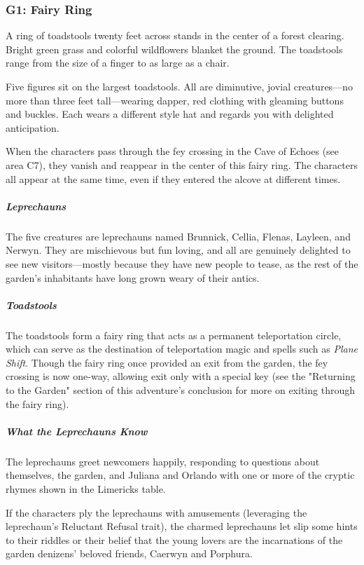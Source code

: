 \documentclass[10pt,a4paper,twoside,bg=print,twocolumn,openany,nodeprecatedcode]{dndbook}
\begin{document}
\subsubsection{G1: Fairy Ring}
\begin{DndReadAloud}{}
A ring of toadstools twenty feet across stands in the center of a forest clearing. Bright green grass and colorful wildflowers blanket the ground. The toadstools range from the size of a finger to as large as a chair.

Five figures sit on the largest toadstools. All are diminutive, jovial creatures—no more than three feet tall—wearing dapper, red clothing with gleaming buttons and buckles. Each wears a different style hat and regards you with delighted anticipation.

\end{DndReadAloud}

When the characters pass through the fey crossing in the Cave of Echoes (see area C7), they vanish and reappear in the center of this fairy ring. The characters all appear at the same time, even if they entered the alcove at different times.

\subparagraph{Leprechauns}
The five creatures are leprechauns named Brunnick, Cellia, Flenas, Layleen, and Nerwyn. They are mischievous but fun loving, and all are genuinely delighted to see new visitors—mostly because they have new people to tease, as the rest of the garden's inhabitants have long grown weary of their antics.

\subparagraph{Toadstools}
The toadstools form a fairy ring that acts as a permanent teleportation circle, which can serve as the destination of teleportation magic and spells such as \textit{Plane Shift}. Though the fairy ring once provided an exit from the garden, the fey crossing is now one-way, allowing exit only with a special key (see the "Returning to the Garden" section of this adventure's conclusion for more on exiting through the fairy ring).

\subparagraph{What the Leprechauns Know}
The leprechauns greet newcomers happily, responding to questions about themselves, the garden, and Juliana and Orlando with one or more of the cryptic rhymes shown in the Limericks table.

If the characters ply the leprechauns with amusements (leveraging the leprechaun's Reluctant Refusal trait), the charmed leprechauns let slip some hints to their riddles or their belief that the young lovers are the incarnations of the garden denizens' beloved friends, Caerwyn and Porphura.
\end{document}
